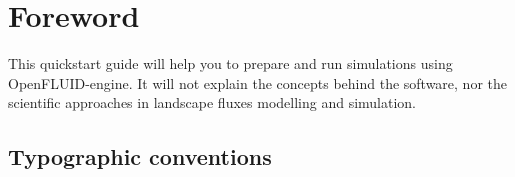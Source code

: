 \chapter*{Foreword}

This quickstart guide will help you to prepare and run simulations using
OpenFLUID-engine. It will not explain the concepts behind the software, nor the
scientific approaches in landscape fluxes modelling and simulation. 

\section*{Typographic conventions}




